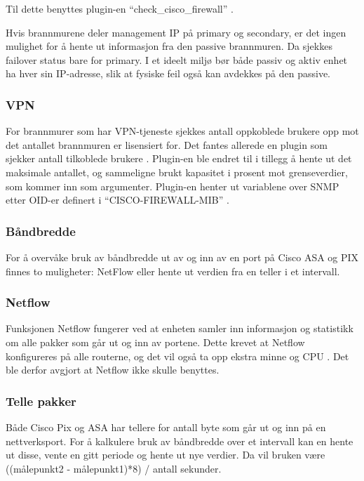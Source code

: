 Til dette benyttes plugin-en ``check\_cisco\_firewall'' \cite{checkciscofirewall}.

Hvis brannmurene deler management IP på primary og secondary, er det ingen mulighet for å hente ut informasjon fra den passive brannmuren. Da sjekkes failover status bare for primary. I et ideelt miljø bør både passiv og aktiv enhet ha hver sin IP-adresse, slik at fysiske feil også kan avdekkes på den passive.

\subsubsection{VPN}
For brannmurer som har VPN-tjeneste sjekkes antall oppkoblede brukere opp mot det antallet brannmuren er lisensiert for. Det fantes allerede en plugin som sjekker antall tilkoblede brukere \cite{checkciscovpn}. Plugin-en ble endret til i tillegg å hente ut det maksimale antallet, og sammeligne brukt kapasitet i prosent mot grenseverdier, som kommer inn som argumenter. Plugin-en henter ut variablene over SNMP etter OID-er definert i ``CISCO-FIREWALL-MIB'' \cite{cisco_fw_mib}.

\subsubsection{Båndbredde}
For å overvåke bruk av båndbredde ut av og inn av en port på Cisco ASA og PIX finnes to muligheter: NetFlow eller hente ut verdien fra en teller i et intervall.

\subsubsection*{Netflow}
Funksjonen Netflow \cite{ciscoiosnetflow} fungerer ved at enheten samler inn informasjon og statistikk om alle pakker som går ut og inn av portene. Dette krevet at Netflow konfigureres på alle routerne, og det vil også ta opp ekstra minne og CPU \cite{cisconetflowperf}. Det ble derfor avgjort at Netflow ikke skulle benyttes.

\subsubsection*{Telle pakker}
Både Cisco Pix og ASA har tellere for antall byte som går ut og inn på en nettverksport. For å kalkulere bruk av båndbredde over et intervall kan en hente ut disse, vente en gitt periode og hente ut nye verdier. Da vil bruken være ((målepunkt2 - målepunkt1)*8) / antall sekunder.

